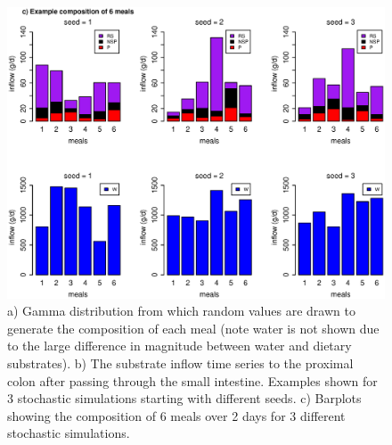 \documentclass[a4paper]{article}
\begin{document}
\begin{figure}
    \includegraphics[scale=0.5]{images/inflowComp.eps}
    \caption{%
a) Gamma distribution from which random values are drawn to generate the composition of each meal (note water is not shown due to the large difference in magnitude between water and dietary substrates). b) The substrate inflow time series to the proximal colon after passing through the small intestine. Examples shown for 3 stochastic simulations starting with different seeds. c) Barplots showing the composition of 6 meals over 2 days for 3 different stochastic simulations.}
    \label{fig:substrateInflow}
\end{figure}
\end{document}
